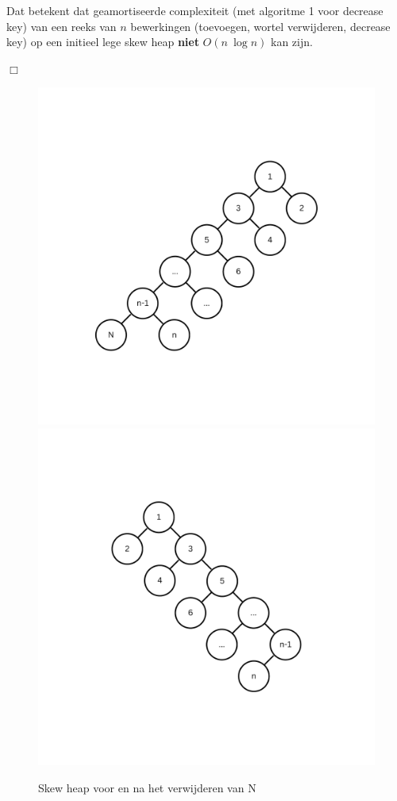 \documentclass[12pt,a4paper,fleqn]{report}
\begin{document}
	Dat betekent dat geamortiseerde complexiteit (met algoritme 1 voor decrease key) van een reeks van $n$ bewerkingen
	(toevoegen, wortel verwijderen, decrease key) op een initieel lege skew heap \textbf{niet} $O(n\ \log n)$ kan zijn.

	\begin{flushright}
		$\Box$
	\end{flushright}

	\begin{figure}
	\includegraphics[height=0.3\textheight] {assets/skew_heap_init.pdf}
	\includegraphics[height=0.3\textheight] {assets/skew_heap_after_remove.pdf}
	\caption{Skew heap voor en na het verwijderen van N}
	\end{figure}
\end{document}
